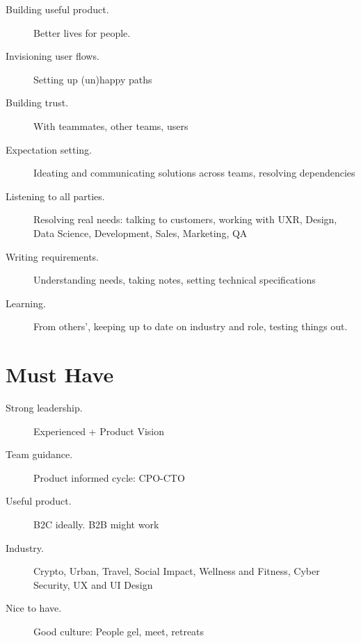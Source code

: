 \documentclass[10pt, a4paper, twocolumn]{article}
\begin{document}
\begin{description}
\item[Building useful product.] Better lives for people. %
\item[Invisioning user flows.] Setting up %
(un)happy paths
\item[Building trust.] With teammates, other teams, users
\item[Expectation setting.] Ideating and communicating solutions across teams, resolving dependencies
\item[Listening to all parties.] Resolving real needs: %
talking to customers,
working with UXR,
Design,
Data Science,
Development,
Sales,
Marketing,
QA
\item[Writing requirements.] Understanding needs, %
taking notes, setting technical specifications
\item[Learning.]
From others', %
keeping up to date on industry and role, testing things out.
\end{description}


\section*{Must Have}

\begin{description}
 \item[Strong leadership.] Experienced + Product Vision
  \item[Team guidance.] Product informed cycle: CPO-CTO
 \item[Useful product.] B2C ideally. B2B might work
  \item[Industry.]
  Crypto,
  Urban,
  Travel,
  Social Impact,
  Wellness and Fitness,
  Cyber Security,
  UX and UI Design \\
  \item[Nice to have.]
 Good culture: People gel, meet, retreats %
\end{description}


\end{document}
